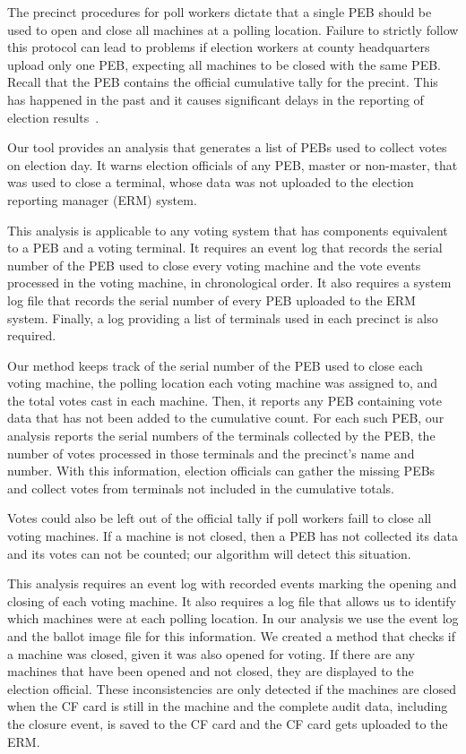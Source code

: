 \label{sec:pebs_not_uploaded}
The precinct procedures for poll workers dictate that a single PEB
should be used to open and close all machines at a polling
location. Failure to strictly follow this protocol can lead to problems if
election workers at county headquarters upload only one PEB, expecting all
machines to be closed with the same PEB. Recall that the PEB contains the
official cumulative tally for the precint. This has happened in the past and it 
causes significant delays in the reporting of election
results~\cite{Buell2011,Mazella2002}. 

Our
tool provides an analysis that generates a list of PEBs used to collect
votes on election day. It warns election officials of any PEB, master
or non-master, that was used to close a terminal, whose data was not
uploaded to the election reporting manager (ERM) system.  

This analysis is applicable to any voting system that has components
equivalent to a PEB and a voting terminal.  It requires an event log
that records the serial number of the PEB used to close every voting
machine and the vote events processed in the voting machine, in
chronological order. It also requires a system log file that records the
serial number of every PEB uploaded to the ERM 
system. Finally, a log providing a list of terminals used in each
precinct is also required.

Our method keeps track of the serial number of the PEB used to close each voting
machine, the polling location each voting machine was assigned
to, and the total votes cast in each machine. Then, it
reports any PEB containing vote data that has not been added to the cumulative
count.  For each such PEB, our analysis reports the serial numbers of the
terminals collected by the PEB, the number of votes processed in those terminals
and the precinct's name and number. With this information, election officials
can gather the missing PEBs and collect votes from terminals not included in the
cumulative totals.

Votes could also be left out of the official tally if poll workers faill to close
all voting machines. If a machine is not closed, then a PEB has
not collected its data and its votes can not be counted; our algorithm
will  detect this situation.   

This analysis requires an event log with recorded events marking the
opening and closing of each voting machine. It also requires a log
file that allows us to identify which machines were at each polling
location. In our analysis we use the event log and the ballot image
file for this information. We created a method that checks if a
machine was closed, given it was also opened for voting.  
If there are any machines that have been opened and not
closed, they are displayed to the election official.  These
inconsistencies are only detected if the machines are closed when the
CF card is still in the machine and the complete audit data, including
the closure event, is saved to the CF card and the CF card gets uploaded to the
ERM.

